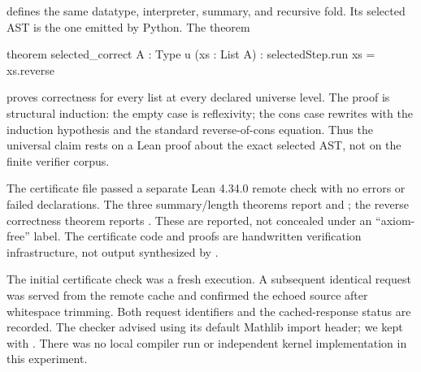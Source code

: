  defines the same  datatype,
interpreter, summary, and recursive fold. Its selected AST is the one emitted
by Python. The theorem
\begin{Code}
theorem selected_correct {A : Type u} (xs : List A) :
    selectedStep.run xs = xs.reverse
\end{Code}
proves correctness for every list at every declared universe level. The proof
is structural induction: the empty case is reflexivity; the cons case rewrites
with the induction hypothesis and the standard reverse-of-cons equation.
Thus the universal claim rests on a Lean proof about the exact selected AST,
not on the finite verifier corpus.

The certificate file passed a separate Lean 4.34.0 remote check with no errors
or failed declarations. The three summary/length theorems report
 and ; the reverse correctness theorem reports
. These are reported, not concealed under an ``axiom-free'' label.
The certificate code and proofs are handwritten verification infrastructure,
not output synthesized by .

The initial certificate check was a fresh execution. A subsequent identical
request was served from the remote cache and confirmed the echoed source after
whitespace trimming. Both request identifiers and the cached-response status
are recorded. The checker advised using its default Mathlib import header;
we kept  with . There was no
local compiler run or independent kernel implementation in this experiment.
